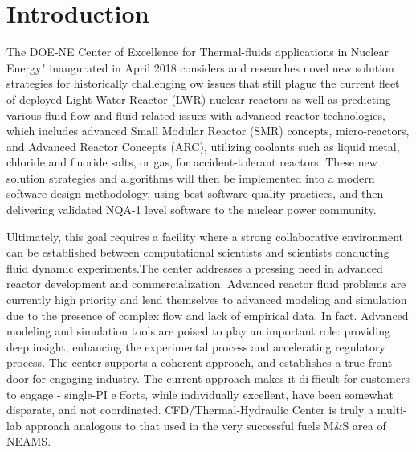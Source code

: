 \section{Introduction}
\label{s:intro}

The DOE-NE Center of Excellence for Thermal-fluids applications in Nuclear Energy" inaugurated in April 2018 considers and researches novel new solution strategies for historically challenging
ow issues that still plague the current fleet of deployed Light Water Reactor (LWR) nuclear reactors as well as predicting various fluid flow and fluid related issues with advanced reactor technologies, which includes advanced Small Modular Reactor (SMR) concepts, micro-reactors, and Advanced Reactor Concepts (ARC), utilizing coolants such as liquid metal, chloride and  fluoride salts, or gas, for accident-tolerant reactors. These new solution strategies and algorithms will then be implemented into a modern software design methodology, using best software quality practices, and then delivering validated NQA-1 level software to the nuclear power community.

Ultimately, this goal requires a facility where a strong collaborative environment can be established between computational scientists and scientists conducting fluid dynamic experiments.The center addresses a pressing need in advanced reactor development and commercialization. Advanced reactor fluid problems are currently high priority and lend themselves to advanced modeling and simulation due to the presence of complex flow and lack of empirical data. In fact. Advanced modeling and simulation tools are poised to play an important role: providing deep insight, enhancing the experimental process and accelerating regulatory process. The center supports a coherent approach, and establishes a true front door for engaging industry. The current approach makes it difficult for customers to engage - single-PI efforts, while individually excellent, have been somewhat disparate, and not coordinated. CFD/Thermal-Hydraulic Center is truly a multi-lab approach analogous to that used in the very successful fuels M&S area of NEAMS.

